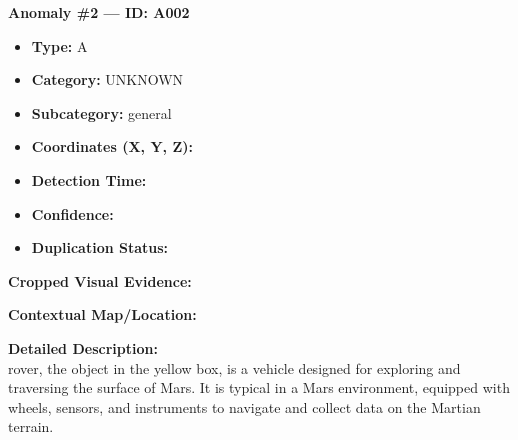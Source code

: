 \documentclass[12pt,a4paper]{report}
\begin{document}
\newpage

\vspace{2em}
\noindent
\textbf{Anomaly \#2 --- ID: A002 }

\begin{itemize}[leftmargin=1.7cm]
    \item \textbf{Type:} A
    \item \textbf{Category:} UNKNOWN
    \item \textbf{Subcategory:} general
    \item \textbf{Coordinates (X, Y, Z):}  
    \item \textbf{Detection Time:} \underline{\hspace*{3.5cm}}
    \item \textbf{Confidence:} \underline{\hspace*{2.3cm}}
    \item \textbf{Duplication Status:} \underline{\hspace*{3cm}}
\end{itemize}

\vspace{0.7em}
\noindent \textbf{Cropped Visual Evidence:}
\begin{center}
\end{center}

\vspace{1em}
\noindent \textbf{Contextual Map/Location:}
\begin{center}
\end{center}

\vspace{1em}
\noindent \textbf{Detailed Description:} \\
  rover, the object in the yellow box, is a vehicle designed for exploring and traversing the surface of Mars. It is typical in a Mars environment, equipped with wheels, sensors, and instruments to navigate and collect data on the Martian terrain.
\end{document}
